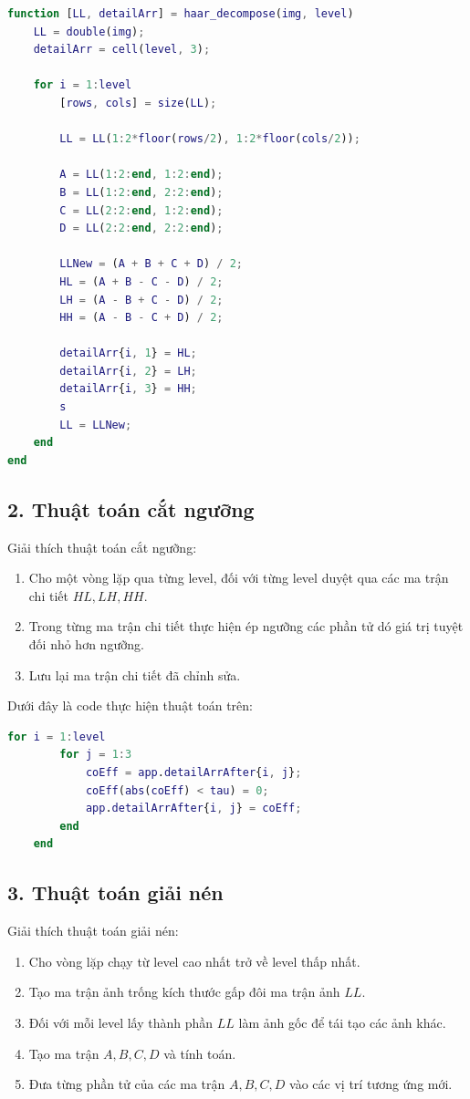 \begin{lstlisting}[language=Matlab]
function [LL, detailArr] = haar_decompose(img, level)
    LL = double(img);
    detailArr = cell(level, 3); 
    
    for i = 1:level
        [rows, cols] = size(LL);
        
        LL = LL(1:2*floor(rows/2), 1:2*floor(cols/2));
        
        A = LL(1:2:end, 1:2:end);
        B = LL(1:2:end, 2:2:end);
        C = LL(2:2:end, 1:2:end);
        D = LL(2:2:end, 2:2:end);
        
        LLNew = (A + B + C + D) / 2;
        HL = (A + B - C - D) / 2;
        LH = (A - B + C - D) / 2;
        HH = (A - B - C + D) / 2;

        detailArr{i, 1} = HL;
        detailArr{i, 2} = LH;
        detailArr{i, 3} = HH;
        s
        LL = LLNew; 
    end
end
\end{lstlisting}

\subsection*{2. Thuật toán cắt ngưỡng}

Giải thích thuật toán cắt ngưỡng:
\begin{enumerate}
    \item Cho một vòng lặp qua từng level, đối với từng level duyệt qua các ma trận chi tiết $HL, LH, HH$.
    \item Trong từng ma trận chi tiết thực hiện ép ngưỡng các phần tử dó giá trị tuyệt đối nhỏ hơn ngưỡng.
    \item Lưu lại ma trận chi tiết đã chỉnh sửa.
\end{enumerate}

Dưới đây là code thực hiện thuật toán trên:
\begin{lstlisting}[language=Matlab]
    for i = 1:level
        for j = 1:3
            coEff = app.detailArrAfter{i, j};
            coEff(abs(coEff) < tau) = 0;
            app.detailArrAfter{i, j} = coEff;
        end
    end

\end{lstlisting}


\subsection*{3. Thuật toán giải nén}

Giải thích thuật toán giải nén:
\begin{enumerate}
    \item Cho vòng lặp chạy từ level cao nhất trở về level thấp nhất.
    \item Tạo ma trận ảnh trống kích thước gấp đôi ma trận ảnh $LL$.
    \item Đối với mỗi level lấy thành phần $LL$ làm ảnh gốc để tái tạo các ảnh khác.
    \item Tạo ma trận $A, B, C, D$ và tính toán.
    \item Đưa từng phần tử của các ma trận $A, B, C, D$ vào các vị trí tương ứng mới.
\end{enumerate}

